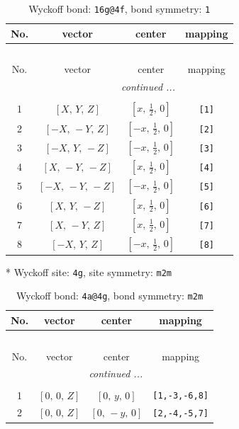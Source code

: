 \documentclass[fleqn,8pt]{jsarticle}
\begin{document}
\begin{longtable}{cccc}
\caption{Wyckoff bond: {\tt 16g@4f}, bond symmetry: {\tt 1}}
 \\
 \hline \hline
No. & vector & center & mapping \\ \hline \endfirsthead

\multicolumn{3}{l}{\tablename\ \thetable{}} \\
 \hline \hline
No. & vector & center & mapping \\ \hline \endhead

 \hline \hline
\multicolumn{3}{r}{\footnotesize\it continued ...} \\ \endfoot

 \hline \hline
\multicolumn{3}{r}{} \\ \endlastfoot

1 & $\left[ X,\, Y,\, Z \right]$ & $\left[ x,\, \frac{1}{2},\, 0 \right]$ & {\tt [1]} \\ \hline
2 & $\left[ - X,\, - Y,\, Z \right]$ & $\left[ - x,\, \frac{1}{2},\, 0 \right]$ & {\tt [2]} \\ \hline
3 & $\left[ - X,\, Y,\, - Z \right]$ & $\left[ - x,\, \frac{1}{2},\, 0 \right]$ & {\tt [3]} \\ \hline
4 & $\left[ X,\, - Y,\, - Z \right]$ & $\left[ x,\, \frac{1}{2},\, 0 \right]$ & {\tt [4]} \\ \hline
5 & $\left[ - X,\, - Y,\, - Z \right]$ & $\left[ - x,\, \frac{1}{2},\, 0 \right]$ & {\tt [5]} \\ \hline
6 & $\left[ X,\, Y,\, - Z \right]$ & $\left[ x,\, \frac{1}{2},\, 0 \right]$ & {\tt [6]} \\ \hline
7 & $\left[ X,\, - Y,\, Z \right]$ & $\left[ x,\, \frac{1}{2},\, 0 \right]$ & {\tt [7]} \\ \hline
8 & $\left[ - X,\, Y,\, Z \right]$ & $\left[ - x,\, \frac{1}{2},\, 0 \right]$ & {\tt [8]} \\
\end{longtable}
* Wyckoff site: {\tt 4g}, site symmetry: {\tt m2m}
\renewcommand{\arraystretch}{1.2}
\begin{longtable}{cccc}
\caption{Wyckoff bond: {\tt 4a@4g}, bond symmetry: {\tt m2m}}
 \\
 \hline \hline
No. & vector & center & mapping \\ \hline \endfirsthead

\multicolumn{3}{l}{\tablename\ \thetable{}} \\
 \hline \hline
No. & vector & center & mapping \\ \hline \endhead

 \hline \hline
\multicolumn{3}{r}{\footnotesize\it continued ...} \\ \endfoot

 \hline \hline
\multicolumn{3}{r}{} \\ \endlastfoot

1 & $\left[ 0,\, 0,\, Z \right]$ & $\left[ 0,\, y,\, 0 \right]$ & {\tt [1,-3,-6,8]} \\ \hline
2 & $\left[ 0,\, 0,\, Z \right]$ & $\left[ 0,\, - y,\, 0 \right]$ & {\tt [2,-4,-5,7]} \\
\end{longtable}
\end{document}
